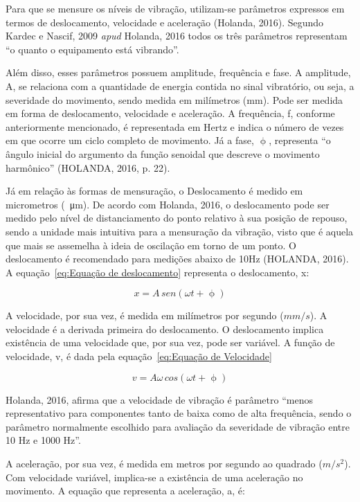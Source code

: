 \documentclass[
	12pt,				
	oneside,			
	a4paper,			
	english,			
	brazil,	
	sumario=abnt-6027-2012		
	]{abntex2ppgsi}
\begin{document}
Para que se mensure os níveis de vibração, utilizam-se parâmetros expressos em termos de deslocamento, velocidade e aceleração (Holanda, 2016). Segundo Kardec e Nascif, 2009 \textit{apud} Holanda, 2016 todos os três parâmetros representam “o quanto o equipamento está vibrando”. 

Além disso, esses parâmetros possuem amplitude, frequência e fase. A amplitude, A, se relaciona com a quantidade de energia contida no sinal vibratório, ou seja, a severidade do movimento, sendo medida em milímetros (mm). Pode ser medida em forma de deslocamento, velocidade e aceleração. A frequência, f, conforme anteriormente mencionado, é representada em Hertz e indica o número de vezes em que ocorre um ciclo completo de movimento. Já a fase, $\upphi$, representa “o ângulo inicial do argumento da função senoidal que descreve o movimento harmônico” (HOLANDA, 2016, p. 22).

Já em relação às formas de mensuração, o Deslocamento é medido em micrometros (\SI{}{\micro\metre}). De acordo com Holanda, 2016, o deslocamento pode ser medido pelo nível de distanciamento do ponto relativo à sua posição de repouso, sendo a unidade mais intuitiva para a mensuração da vibração, visto que é aquela que mais se assemelha à ideia de oscilação em torno de um ponto. O deslocamento é recomendado para medições abaixo de 10Hz (HOLANDA, 2016). A equação~\ref{eq:Equação de deslocamento} representa o deslocamento, x:

\begin{equation}
	x = A \,sen (\omega t + \upphi)
	\label{eq:Equação de deslocamento}
\end{equation}

A velocidade, por sua vez, é medida em milímetros por segundo ($mm/s$). A velocidade é a derivada primeira do deslocamento. O deslocamento implica existência de uma velocidade que, por sua vez, pode ser variável. A função de velocidade, v, é dada pela equação~\ref{eq:Equação de Velocidade}

\begin{equation}
	v = A\omega \,cos (\omega t + \upphi)
	\label{eq:Equação de Velocidade}
\end{equation}

Holanda, 2016, afirma que a velocidade de vibração é parâmetro “menos representativo para componentes tanto de baixa como de alta frequência, sendo o parâmetro normalmente escolhido para avaliação da severidade de vibração entre 10 Hz e 1000 Hz”.

A aceleração, por sua vez, é medida em metros por segundo ao quadrado ($m/s^{2}$). Com velocidade variável, implica-se a existência de uma aceleração no movimento. A equação que representa a aceleração, a, é:
\end{document}
